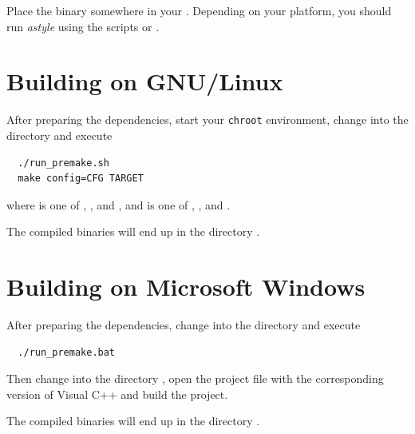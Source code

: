 Place the binary somewhere in your .  Depending on your
platform, you should run \emph{astyle} using the scripts
 or .

\section{Building on GNU/Linux}

After preparing the dependencies, start your \texttt{chroot}
environment, change into the directory  and execute

\begin{verbatim}
  ./run_premake.sh
  make config=CFG TARGET
\end{verbatim}

where  is one of ,
,  and
, and  is one of
,
,
 and
.

The compiled binaries will end up in the directory .

\section{Building on Microsoft Windows}

After preparing the dependencies, change into the directory
 and execute

\begin{verbatim}
  ./run_premake.bat
\end{verbatim}

Then change into the directory , open the
project file with the corresponding version of Visual C++ and build
the project.

The compiled binaries will end up in the directory .






